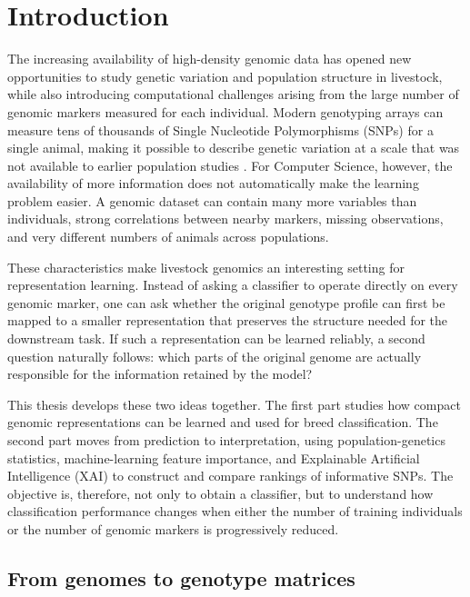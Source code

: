 \chapter{Introduction}
\label{chap:introduction}

The increasing availability of high-density genomic data has opened
new opportunities to study genetic variation and population structure
in livestock, while also introducing computational challenges arising
from the large number of genomic markers measured for each individual.
Modern genotyping arrays can measure tens of thousands of Single
Nucleotide Polymorphisms (SNPs) for a single animal, making it
possible to describe genetic variation at a scale that was not
available to earlier population studies
\cite{georges2019livestock, morin2004snps}. For Computer Science,
however, the availability of more information does not automatically
make the learning problem easier. A genomic dataset can contain many
more variables than individuals, strong correlations between nearby
markers, missing observations, and very different numbers of animals
across populations.

These characteristics make livestock genomics an interesting setting
for representation learning. Instead of asking a classifier to
operate directly on every genomic marker, one can ask whether the
original genotype profile can first be mapped to a smaller
representation that preserves the structure needed for the downstream
task. If such a representation can be learned reliably, a second
question naturally follows: which parts of the original genome are
actually responsible for the information retained by the model?

This thesis develops these two ideas together. The first part studies
how compact genomic representations can be learned and used for breed
classification. The second part moves from prediction to
interpretation, using population-genetics statistics, machine-learning
feature importance, and Explainable Artificial Intelligence (XAI) to
construct and compare rankings of informative SNPs. The objective is,
therefore, not only to obtain a classifier, but to understand how
classification performance changes when either the number of training
individuals or the number of genomic markers is progressively reduced.

\section{From genomes to genotype matrices}
\label{sec:from_genomes_to_matrices}

